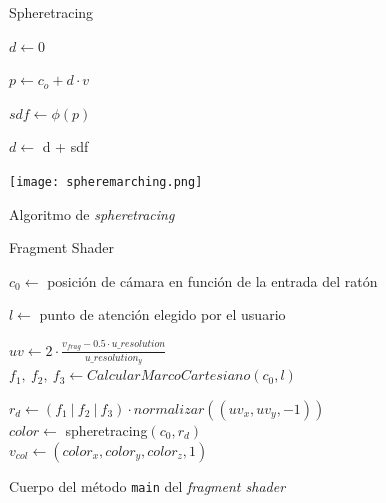 \begin{figure}[ht!]
    \centering
    \begin{minipage}{0.58\textwidth}
       \begin{algorithm}[H]
            \caption{Spheretracing}
                $d \gets 0$ 
                
                 {
                    $p \gets c_o + d \cdot v$
                    
                    $sdf \gets \phi(p)$
                    
            
                    $d \gets$ d + sdf
            
                }
        \end{algorithm}
    \end{minipage}%
    \hfill
    \begin{minipage}{0.4\textwidth}
        \texttt{[image: spheremarching.png]}
    \end{minipage}
    \caption{Algoritmo de \textit{spheretracing}}
    \label{a:spheretracing}
\end{figure}

\begin{figure}[ht!]
    \centering
    
       \begin{algorithm}[H]
            \caption{Fragment Shader}

                $c_0 \gets $ posición de cámara en función de la entrada del ratón

                $l\gets $ punto de atención elegido por el usuario
                
                $uv \gets 2\cdot \frac{v_{frag} - 0.5\cdot u\_resolution}{u\_resolution_y}$\\[5pt]

                $f_1,\ f_2,\ f_3 \gets CalcularMarcoCartesiano(c_0, l)$
                
                $r_d \gets (f_1\ \vert \ f_2\ \vert \ f_3)\cdot normalizar ((uv_x, uv_y,-1))$\\[5pt]

                $color \gets$ spheretracing$(c_0, r_d)$\\[5pt]

                $v_{col} \gets (color_x, color_y, color_z, 1)$
        \end{algorithm}
    \caption{Cuerpo del método \texttt{main} del \textit{fragment shader}}
    \label{fig:mainFS}
\end{figure}


